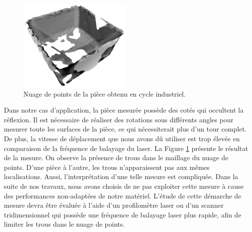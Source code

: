 \begin{figure}[hbtp]
	\centering
	\includegraphics[width=0.5\textwidth]{../Chap2/Figures/online_3d_scan.png}
	\caption{Nuage de points de la pièce obtenu en cycle industriel.}
	\label{fig:online_scan_result}
\end{figure}
Dans notre cas d'application, la pièce mesurée possède des cotés qui occultent la réflexion.
Il est nécessaire de réaliser des rotations sous différents angles pour mesurer toute les surfaces de la pièce, ce qui nécessiterait plus d'un tour complet.
De plus, la vitesse de déplacement que nous avons dû utiliser est trop élevée en comparaison de la fréquence de balayage du laser.
La Figure \ref{fig:online_scan_result} présente le résultat de la mesure.
On observe la présence de trous dans le maillage du nuage de points.
D'une pièce à l'autre, les trous n'apparaissent pas aux mêmes localisations.
Aussi, l'interprétation d'une telle mesure est compliquée. 
Dans la suite de nos travaux, nous avons choisis de ne pas exploiter cette mesure à cause des performances non-adaptées de notre matériel.
L'étude de cette démarche de mesure devra être évaluée à l'aide d'un profilomètre laser ou d'un scanner tridimensionnel qui possède une fréquence de balayage laser plus rapide, afin de limiter les trous dans le nuage de points.

